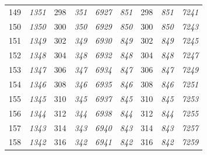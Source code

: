 \documentclass[10pt,fleqn]{article}
\begin{document}
\begin{longtable}{c|cccccccc}
149 & {\color{blue} \it 1351 \rm} & {\color{black} 298} & {\color{blue} \it 351 \rm} & {\color{blue} \it 6927 \rm} & {\color{blue} \it 851 \rm} & {\color{black} 298} & {\color{blue} \it 851 \rm} & {\color{blue} \it 7241 \rm} \\
150 & {\color{blue} \it 1350 \rm} & {\color{black} 300} & {\color{blue} \it 350 \rm} & {\color{blue} \it 6929 \rm} & {\color{blue} \it 850 \rm} & {\color{black} 300} & {\color{blue} \it 850 \rm} & {\color{blue} \it 7243 \rm} \\
151 & {\color{blue} \it 1349 \rm} & {\color{black} 302} & {\color{blue} \it 349 \rm} & {\color{blue} \it 6930 \rm} & {\color{blue} \it 849 \rm} & {\color{black} 302} & {\color{blue} \it 849 \rm} & {\color{blue} \it 7245 \rm} \\
152 & {\color{blue} \it 1348 \rm} & {\color{black} 304} & {\color{blue} \it 348 \rm} & {\color{blue} \it 6932 \rm} & {\color{blue} \it 848 \rm} & {\color{black} 304} & {\color{blue} \it 848 \rm} & {\color{blue} \it 7247 \rm} \\
153 & {\color{blue} \it 1347 \rm} & {\color{black} 306} & {\color{blue} \it 347 \rm} & {\color{blue} \it 6934 \rm} & {\color{blue} \it 847 \rm} & {\color{black} 306} & {\color{blue} \it 847 \rm} & {\color{blue} \it 7249 \rm} \\
154 & {\color{blue} \it 1346 \rm} & {\color{black} 308} & {\color{blue} \it 346 \rm} & {\color{blue} \it 6935 \rm} & {\color{blue} \it 846 \rm} & {\color{black} 308} & {\color{blue} \it 846 \rm} & {\color{blue} \it 7251 \rm} \\
155 & {\color{blue} \it 1345 \rm} & {\color{black} 310} & {\color{blue} \it 345 \rm} & {\color{blue} \it 6937 \rm} & {\color{blue} \it 845 \rm} & {\color{black} 310} & {\color{blue} \it 845 \rm} & {\color{blue} \it 7253 \rm} \\
156 & {\color{blue} \it 1344 \rm} & {\color{black} 312} & {\color{blue} \it 344 \rm} & {\color{blue} \it 6938 \rm} & {\color{blue} \it 844 \rm} & {\color{black} 312} & {\color{blue} \it 844 \rm} & {\color{blue} \it 7255 \rm} \\
157 & {\color{blue} \it 1343 \rm} & {\color{black} 314} & {\color{blue} \it 343 \rm} & {\color{blue} \it 6940 \rm} & {\color{blue} \it 843 \rm} & {\color{black} 314} & {\color{blue} \it 843 \rm} & {\color{blue} \it 7257 \rm} \\
158 & {\color{blue} \it 1342 \rm} & {\color{black} 316} & {\color{blue} \it 342 \rm} & {\color{blue} \it 6941 \rm} & {\color{blue} \it 842 \rm} & {\color{black} 316} & {\color{blue} \it 842 \rm} & {\color{blue} \it 7259 \rm} \\

\end{longtable}
\end{document}
